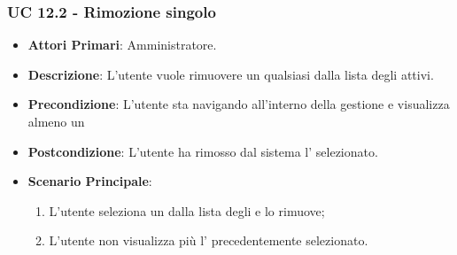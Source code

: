 		\subsubsection{UC 12.2 - Rimozione singolo }
		\begin{itemize}
			\item \textbf{Attori Primari}: Amministratore.
			\item \textbf{Descrizione}: L'utente vuole rimuovere un qualsiasi  dalla lista degli  attivi.
			\item \textbf{Precondizione}: L'utente sta navigando all'interno della gestione  e visualizza almeno un 
			\item \textbf{Postcondizione}: L'utente ha rimosso dal sistema l' selezionato.
			\item \textbf{Scenario Principale}:
			\begin{enumerate}
				\item{L'utente seleziona un  dalla lista degli  e lo rimuove;}
				\item{L'utente non visualizza più l' precedentemente selezionato.}
			\end{enumerate}	
		\end{itemize}